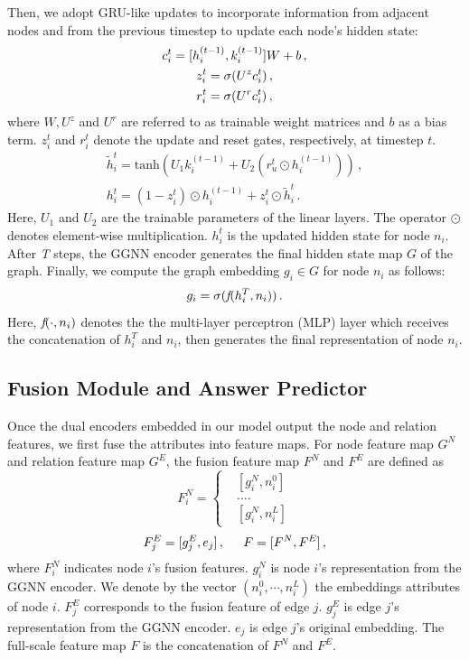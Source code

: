 \documentclass[letterpaper]{article} %
\begin{document}
Then, we adopt GRU-like updates to incorporate information from adjacent nodes and from the previous timestep to update each node's hidden state:
\begin{gather}\notag
    c_i^t = [h_i^{(t-1)}, k_{i}^{(t-1)}] W + b \, ,\\
    z_i^t = \sigma(U^z c_i^t) \, , \\\notag
    r_i^t = \sigma(U^r c_i^t)\, , \notag
\end{gather}
where $W, U^z$ and $U^r$ are referred to as trainable weight matrices and $b$ as a bias term.
$z_i^t$ and $r_i^t$ denote the update and reset gates, respectively, at timestep $t$.
\begin{gather}
    \tilde{h}_i^t = \text{tanh}(U_1 k_{i}^{(t-1)} + U_2(r_u^t \odot h_i^{(t-1)})) \, ,\\
    h_i^t = (1-z_i^t)\odot h_i^{(t-1)} + z_i^t\odot \tilde{h}_i^t \, .
\end{gather}
Here, $U_1$ and $U_2$ are the trainable parameters of the linear layers. 
The operator $\odot$ denotes element-wise multiplication. 
$h_i^t$ is the updated hidden state for node ${n}_i$. After \emph{T}  steps, the GGNN encoder generates the final hidden state map $G$ of the graph. Finally, we compute the graph embedding $g_i \in G$ for node ${n}_i$ as follows:
\begin{equation}
    g_i = \sigma( \emph{f}(h_i^T, n_i)) \, .
\end{equation}
Here, $\emph{f}(\cdot, n_i)$ denotes the the multi-layer perceptron (MLP) layer which receives the concatenation of $h_i^T$ and $n_i$, then generates the final representation of node ${n}_i$. 

\subsection{Fusion Module and Answer Predictor}
Once the dual encoders embedded in our model output the node and relation features, we first fuse the attributes into feature maps. For node feature map $G^N$ and relation feature map $G^E$, the fusion feature map $F^N$ and $F^E$ are defined as
$$ F_i^N =\left\{
    \begin{aligned}
    &[g_i^N, n_i^0]\\
    &....\\
    &[g_i^N, n_i^L]
    \end{aligned}
\right .
$$
\begin{gather}
    F_j^E = [g_j^E, e_j] \, , \hspace{0.2in}
    F = [F^N, F^E] \, ,
\end{gather}
where $F_i^N$ indicates node $i$'s fusion features. 
$g_i^N$ is node $i$'s representation from the GGNN encoder. 
We denote by the vector $(n_i^0, \cdots,n_i^L)$ the embeddings attributes of node $i$. 
$F_j^E$ corresponds to the fusion feature of edge $j$. $g_j^E$ is edge $j$'s representation from the GGNN encoder. $e_j$ is edge $j$'s original embedding. 
The full-scale feature map $F$ is the concatenation of $F^N$ and $F^E$.
\end{document}
